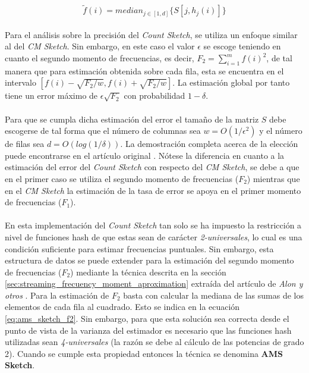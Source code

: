 \documentclass{subfiles}
\begin{document}
      \begin{equation}
      \label{eq:count_sketch_estimation_2}
      \widetilde{f}(i) = median_{j \in [1,d]}\{S[j, h_j(i)]\}
      \end{equation}

      \paragraph{}
      Para el análisis sobre la precisión del \emph{Count Sketch}, se utiliza un enfoque similar al del \emph{CM Sketch}. Sin embargo, en este caso el valor $\epsilon$ se escoge teniendo en cuanto el segundo momento de frecuencias, es decir, $F_2 = \sum_{i=1}^mf(i)^2$, de tal manera que para estimación obtenida sobre cada fila, esta se encuentra en el intervalo $[f(i) - \sqrt{F_2/w}, f(i) + \sqrt{F_2/w}]$. La estimación global por tanto tiene un error máximo de $\epsilon\sqrt{F_2}$ con probabilidad $1- \delta$.

      \paragraph{}
      Para que se cumpla dicha estimación del error el tamaño de la matriz $S$ debe escogerse de tal forma que el número de columnas sea $w = O(1/\epsilon^2)$ y el número de filas sea $d = O(log(1/\delta))$. La demostración completa acerca de la elección puede encontrarse en el artículo original \cite{charikar2002finding}. Nótese la diferencia en cuanto a la estimación del error del \emph{Count Sketch} con respecto del \emph{CM Sketch}, se debe a que en el primer caso se utiliza el segundo momento de frecuencias ($F_2$) mientras que en el \emph{CM Sketch} la estimación de la tasa de error se apoya en el primer momento de frecuencias ($F_1$).

      \paragraph{}
      En esta implementación del \emph{Count Sketch} tan solo se ha impuesto la restricción a nivel de funciones hash de que estas sean de carácter \emph{2-universales}, lo cual es una condición suficiente para estimar frecuencias puntuales. Sin embargo, esta estructura de datos se puede extender para la estimación del segundo momento de frecuencias ($F_2$) mediante la técnica descrita en la sección \ref{sec:streaming_frecuency_moment_aproximation} extraída del artículo de \emph{Alon y otros} \cite{alon1996space}. Para la estimación de $F_2$ basta con calcular la mediana de las sumas de los elementos de cada fila al cuadrado. Esto se indica en la ecuación \eqref{eq:ams_sketch_f2}. Sin embargo, para que esta solución sea correcta desde el punto de vista de la varianza del estimador es necesario que las funciones hash utilizadas sean \emph{4-universales} (la razón se debe al cálculo de las potencias de grado 2). Cuando se cumple esta propiedad entonces la técnica se denomina \textbf{AMS Sketch}.
\end{document}
